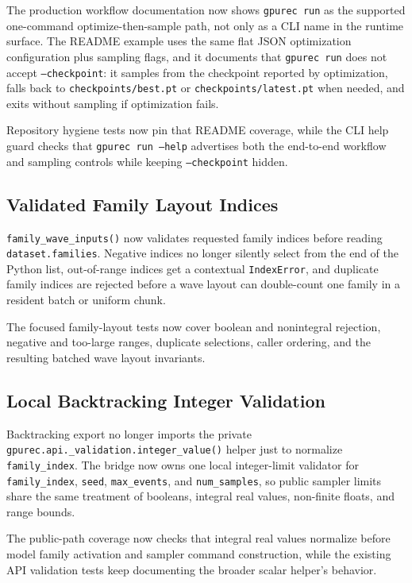 \documentclass[11pt]{article}
\begin{document}
The production workflow documentation now shows \texttt{gpurec run} as the
supported one-command optimize-then-sample path, not only as a CLI name in the
runtime surface.  The README example uses the same flat JSON optimization
configuration plus sampling flags, and it documents that \texttt{gpurec run}
does not accept \texttt{--checkpoint}: it samples from the checkpoint reported
by optimization, falls back to \texttt{checkpoints/best.pt} or
\texttt{checkpoints/latest.pt} when needed, and exits without sampling if
optimization fails.

Repository hygiene tests now pin that README coverage, while the CLI help guard
checks that \texttt{gpurec run --help} advertises both the end-to-end workflow
and sampling controls while keeping \texttt{--checkpoint} hidden.

\subsection{Validated Family Layout Indices}

\texttt{family\_wave\_inputs()} now validates requested family indices before
reading \texttt{dataset.families}.  Negative indices no longer silently select
from the end of the Python list, out-of-range indices get a contextual
\texttt{IndexError}, and duplicate family indices are rejected before a wave
layout can double-count one family in a resident batch or uniform chunk.

The focused family-layout tests now cover boolean and nonintegral rejection,
negative and too-large ranges, duplicate selections, caller ordering, and the
resulting batched wave layout invariants.

\subsection{Local Backtracking Integer Validation}

Backtracking export no longer imports the private
\texttt{gpurec.api.\_validation.integer\_value()} helper just to normalize
\texttt{family\_index}.  The bridge now owns one local integer-limit validator
for \texttt{family\_index}, \texttt{seed}, \texttt{max\_events}, and
\texttt{num\_samples}, so public sampler limits share the same treatment of
booleans, integral real values, non-finite floats, and range bounds.

The public-path coverage now checks that integral real values normalize before
model family activation and sampler command construction, while the existing
API validation tests keep documenting the broader scalar helper's behavior.
\end{document}

